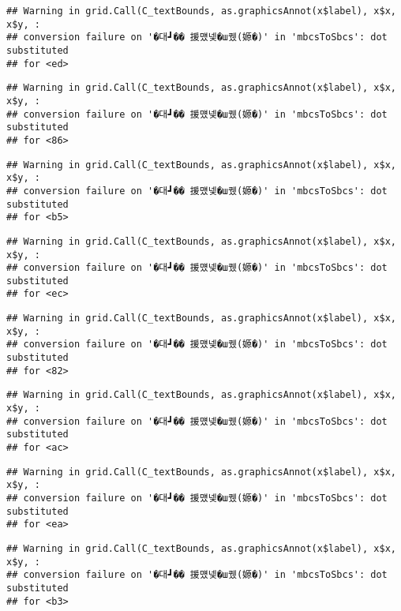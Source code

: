 \documentclass[
]{article}
\begin{document}
\begin{verbatim}
## Warning in grid.Call(C_textBounds, as.graphicsAnnot(x$label), x$x, x$y, :
## conversion failure on '�대┛�� 援먰넻�ш퀬(嫄�)' in 'mbcsToSbcs': dot substituted
## for <ed>
\end{verbatim}

\begin{verbatim}
## Warning in grid.Call(C_textBounds, as.graphicsAnnot(x$label), x$x, x$y, :
## conversion failure on '�대┛�� 援먰넻�ш퀬(嫄�)' in 'mbcsToSbcs': dot substituted
## for <86>
\end{verbatim}

\begin{verbatim}
## Warning in grid.Call(C_textBounds, as.graphicsAnnot(x$label), x$x, x$y, :
## conversion failure on '�대┛�� 援먰넻�ш퀬(嫄�)' in 'mbcsToSbcs': dot substituted
## for <b5>
\end{verbatim}

\begin{verbatim}
## Warning in grid.Call(C_textBounds, as.graphicsAnnot(x$label), x$x, x$y, :
## conversion failure on '�대┛�� 援먰넻�ш퀬(嫄�)' in 'mbcsToSbcs': dot substituted
## for <ec>
\end{verbatim}

\begin{verbatim}
## Warning in grid.Call(C_textBounds, as.graphicsAnnot(x$label), x$x, x$y, :
## conversion failure on '�대┛�� 援먰넻�ш퀬(嫄�)' in 'mbcsToSbcs': dot substituted
## for <82>
\end{verbatim}

\begin{verbatim}
## Warning in grid.Call(C_textBounds, as.graphicsAnnot(x$label), x$x, x$y, :
## conversion failure on '�대┛�� 援먰넻�ш퀬(嫄�)' in 'mbcsToSbcs': dot substituted
## for <ac>
\end{verbatim}

\begin{verbatim}
## Warning in grid.Call(C_textBounds, as.graphicsAnnot(x$label), x$x, x$y, :
## conversion failure on '�대┛�� 援먰넻�ш퀬(嫄�)' in 'mbcsToSbcs': dot substituted
## for <ea>
\end{verbatim}

\begin{verbatim}
## Warning in grid.Call(C_textBounds, as.graphicsAnnot(x$label), x$x, x$y, :
## conversion failure on '�대┛�� 援먰넻�ш퀬(嫄�)' in 'mbcsToSbcs': dot substituted
## for <b3>
\end{verbatim}
\end{document}
